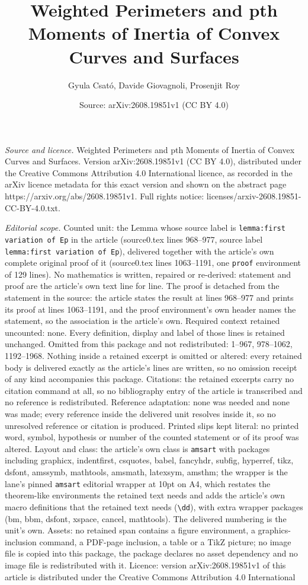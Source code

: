 \documentclass[10pt,a4paper]{amsart}
\title[Weighted Perimeters and pth Moments of Inertia of Convex Cur]{Weighted Perimeters and pth Moments of Inertia of Convex Curves and Surfaces}
\author{Gyula Csat\'o, Davide Giovagnoli, Prosenjit Roy}
\date{Source: arXiv:2608.19851v1 (CC BY 4.0)}
\begin{document}
\maketitle

\noindent\emph{Source and licence.} Weighted Perimeters and pth Moments of Inertia of Convex Curves and Surfaces. Version arXiv:2608.19851v1 (CC BY 4.0), distributed under the Creative Commons Attribution 4.0 International licence, as recorded in the arXiv licence metadata for this exact version and shown on the abstract page https://arxiv.org/abs/2608.19851v1. Full rights notice: licenses/arxiv-2608.19851-CC-BY-4.0.txt.\par\smallskip

\noindent\textit{Editorial scope.} Counted unit: the Lemma whose source label is \texttt{lemma:first variation of Ep} in the article (source0.tex lines 968--977, source label \texttt{lemma:first variation of Ep}), delivered together with the article's own complete original proof of it (source0.tex lines 1063--1191, one \texttt{proof} environment of 129 lines). No mathematics is written, repaired or re-derived: statement and proof are the article's own text line for line. The proof is detached from the statement in the source: the article states the result at lines 968--977 and prints its proof at lines 1063--1191, and the proof environment's own header names the statement, so the association is the article's own. Required context retained uncounted: none. Every definition, display and label of those lines is retained unchanged. Omitted from this package and not redistributed: 1--967, 978--1062, 1192--1968. Nothing inside a retained excerpt is omitted or altered: every retained body is delivered exactly as the article's lines are written, so no omission receipt of any kind accompanies this package. Citations: the retained excerpts carry no citation command at all, so no bibliography entry of the article is transcribed and no reference is redistributed. Reference adaptation: none was needed and none was made; every reference inside the delivered unit resolves inside it, so no unresolved reference or citation is produced. Printed slips kept literal: no printed word, symbol, hypothesis or number of the counted statement or of its proof was altered. Layout and class: the article's own class is \texttt{amsart} with packages including graphicx, indentfirst, csquotes, babel, fancyhdr, subfig, hyperref, tikz, dsfont, amssymb, mathtools, amsmath, latexsym, amsthm; the wrapper is the lane's pinned \texttt{amsart} editorial wrapper at 10pt on A4, which restates the theorem-like environments the retained text needs and adds the article's own macro definitions that the retained text needs (\texttt{\textbackslash dd}), with extra wrapper packages (bm, bbm, dsfont, xspace, cancel, mathtools). The delivered numbering is the unit's own. Assets: no retained span contains a figure environment, a graphics-inclusion command, a PDF-page inclusion, a table or a TikZ picture; no image file is copied into this package, the package declares no asset dependency and no image file is redistributed with it. Licence: version arXiv:2608.19851v1 of this article is distributed under the Creative Commons Attribution 4.0 International 
\end{document}
